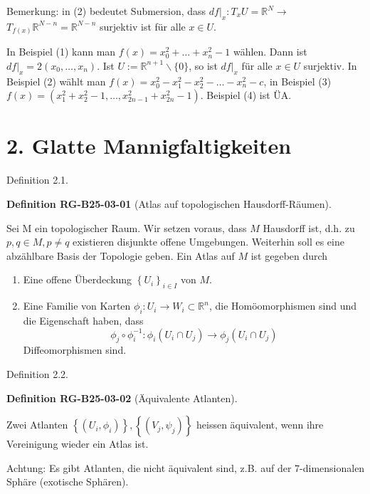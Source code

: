 \documentclass[10pt, letterpaper]{article}
\newcommand{\CustomHeading}[3]{%
  \par\medskip\noindent%
  \textbf{#1 #2} \textnormal{(#3)}.\enskip%
}
\newenvironment{DEF}[2]{\begin{unitbox}\CustomHeading{Definition}{#1}{#2}}{\end{unitbox}}
\begin{document}
Bemerkung: in (2) bedeutet Submersion, dass $\left.d f\right|_{x}: T_{x} U=\mathbb{R}^{N} \rightarrow$ $T_{f(x)} \mathbb{R}^{N-n}=\mathbb{R}^{N-n}$ surjektiv ist für alle $x \in U$.

In Beispiel (1) kann man $f(x)=x_{0}^{2}+\ldots+x_{n}^{2}-1$ wählen. Dann ist $\left.d f\right|_{x}=2\left(x_{0}, \ldots, x_{n}\right)$. Ist $U:=\mathbb{R}^{n+1} \backslash\{0\}$, so ist $\left.d f\right|_{x}$ für alle $x \in U$ surjektiv. In Beispiel (2) wählt man $f(x)=x_{0}^{2}-x_{1}^{2}-x_{2}^{2}-\ldots-x_{n}^{2}-c$, in Beispiel (3) $f(x)=\left(x_{1}^{2}+x_{2}^{2}-1, \ldots, x_{2 n-1}^{2}+x_{2 n}^{2}-1\right)$. Beispiel (4) ist ÜA.

\section*{2. Glatte Mannigfaltigkeiten}


Definition 2.1.


\begin{DEF}{RG-B25-03-01}{Atlas auf topologischen Hausdorff-Räumen}
Sei M ein topologischer Raum. Wir setzen voraus, dass $M$ Hausdorff ist, d.h. zu $p, q \in M, p \neq q$ existieren disjunkte offene Umgebungen. Weiterhin soll es eine abzählbare Basis der Topologie geben. Ein Atlas auf $M$ ist gegeben durch
\begin{enumerate}
  \item Eine offene Überdeckung $\left\{U_{i}\right\}_{i \in I}$ von $M$.
  \item Eine Familie von Karten $\phi_{i}: U_{i} \rightarrow W_{i} \subset \mathbb{R}^{n}$, die Homöomorphismen sind und die Eigenschaft haben, dass
  $$
  \phi_{j} \circ \phi_{i}^{-1}: \phi_{i}\left(U_{i} \cap U_{j}\right) \rightarrow \phi_{j}\left(U_{i} \cap U_{j}\right)
  $$
  Diffeomorphismen sind.
\end{enumerate}
\end{DEF}



Definition 2.2. 

\begin{DEF}{RG-B25-03-02}{Äquivalente Atlanten}
Zwei Atlanten $\left\{\left(U_{i}, \phi_{i}\right)\right\},\left\{\left(V_{j}, \psi_{j}\right)\right\}$ heissen äquivalent, wenn ihre Vereinigung wieder ein Atlas ist.
\end{DEF}

Achtung: Es gibt Atlanten, die nicht äquivalent sind, z.B. auf der 7-dimensionalen Sphäre (exotische Sphären).
\end{document}
